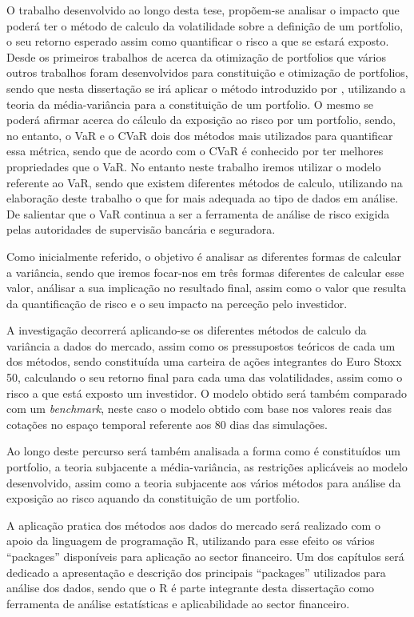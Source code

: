 \documentclass[
  12pt,
  a4paper,
  openany]{book}
\begin{document}
O trabalho desenvolvido ao longo desta tese, propõem-se analisar o impacto que poderá ter o método de calculo da volatilidade sobre a definição de um portfolio, o seu retorno esperado assim como quantificar o risco a que se estará exposto. Desde os primeiros trabalhos de \citet{Markowitz1952} acerca da otimização de portfolios que vários outros trabalhos foram desenvolvidos para constituição e otimização de portfolios, sendo que nesta dissertação se irá aplicar o método introduzido por \citet{Markowitz1952}, utilizando a teoria da média-variância para a constituição de um portfolio. O mesmo se poderá afirmar acerca do cálculo da exposição ao risco por um portfolio, sendo, no entanto, o VaR e o CVaR dois dos métodos mais utilizados para quantificar essa métrica, sendo que de acordo com \citet{OptVaR2000} o CVaR é conhecido por ter melhores propriedades que o VaR. No entanto neste trabalho iremos utilizar o modelo referente ao VaR, sendo que existem diferentes métodos de calculo, utilizando na elaboração deste trabalho o que for mais adequada ao tipo de dados em análise. De salientar que o VaR continua a ser a ferramenta de análise de risco exigida pelas autoridades de supervisão bancária e seguradora.

Como inicialmente referido, o objetivo é analisar as diferentes formas de calcular a variância, sendo que iremos focar-nos em três formas diferentes de calcular esse valor, análisar a sua implicação no resultado final, assim como o valor que resulta da quantificação de risco e o seu impacto na perceção pelo investidor.

A investigação decorrerá aplicando-se os diferentes métodos de calculo da variância a dados do mercado, assim como os pressupostos teóricos de cada um dos métodos, sendo constituída uma carteira de ações integrantes do Euro Stoxx 50, calculando o seu retorno final para cada uma das volatilidades, assim como o risco a que está exposto um investidor. O modelo obtido será também comparado com um \emph{benchmark}, neste caso o modelo obtido com base nos valores reais das cotações no espaço temporal referente aos 80 dias das simulações.

Ao longo deste percurso será também analisada a forma como é constituídos um portfolio, a teoria subjacente a média-variância, as restrições aplicáveis ao modelo desenvolvido, assim como a teoria subjacente aos vários métodos para análise da exposição ao risco aquando da constituição de um portfolio.

A aplicação pratica dos métodos aos dados do mercado será realizado com o apoio da linguagem de programação R, utilizando para esse efeito os vários ``packages'' disponíveis para aplicação ao sector financeiro. Um dos capítulos será dedicado a apresentação e descrição dos principais ``packages'' utilizados para análise dos dados, sendo que o R é parte integrante desta dissertação como ferramenta de análise estatísticas e aplicabilidade ao sector financeiro.
\end{document}
